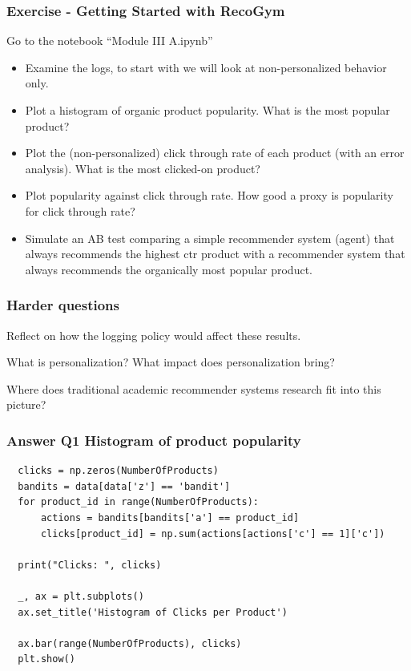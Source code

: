   \begin{frame}
    \frametitle{Exercise - Getting Started with RecoGym}

    Go to the notebook ``Module III A.ipynb''
\begin{itemize}
  \item Examine the logs, to start with we will look at non-personalized behavior only.
  \item Plot a histogram of organic product popularity. What is the most popular product?  
  \item Plot the (non-personalized) click through rate of each product (with an error analysis).  What is the most clicked-on product?
  \item Plot popularity against click through rate.  How good a proxy is popularity for click through rate?
  \item Simulate an AB test comparing a simple recommender system (agent) that always recommends the highest ctr product with a recommender system that always recommends the organically most popular product.
\end{itemize}
\end{frame}

\begin{frame}
  \frametitle{Harder questions}

Reflect on how the logging policy would affect these results.

\pause

What is personalization? What impact does personalization bring?

\pause

Where does traditional academic recommender systems research fit into this picture?  

\end{frame}



\begin{frame}[fragile]
  \frametitle{Answer Q1 Histogram of product popularity}
\begin{small}
\begin{verbatim}
  clicks = np.zeros(NumberOfProducts)
  bandits = data[data['z'] == 'bandit']
  for product_id in range(NumberOfProducts):
      actions = bandits[bandits['a'] == product_id]
      clicks[product_id] = np.sum(actions[actions['c'] == 1]['c'])
      
  print("Clicks: ", clicks)
  
  _, ax = plt.subplots()
  ax.set_title('Histogram of Clicks per Product')
  
  ax.bar(range(NumberOfProducts), clicks)
  plt.show()
\end{verbatim}
\end{small}
\end{frame}


